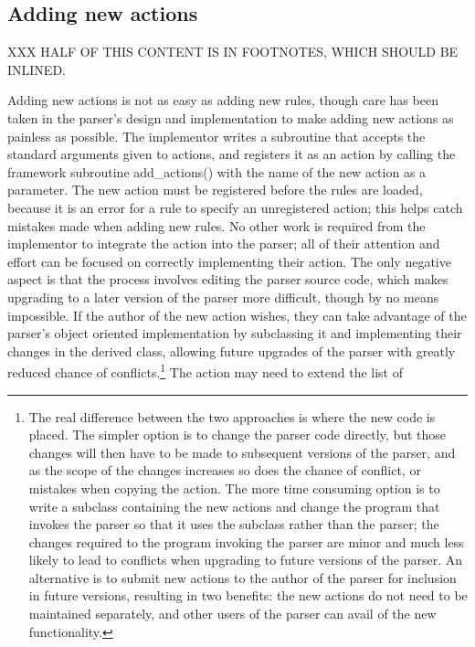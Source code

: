 \subsection{Adding new actions}

\label{adding new actions}

XXX HALF OF THIS CONTENT IS IN FOOTNOTES, WHICH SHOULD BE INLINED\@.

Adding new actions is not as easy as adding new rules, though care has been
taken in the parser's design and implementation to make adding new actions
as painless as possible.  The implementor writes a subroutine that accepts
the standard arguments given to actions, and registers it as an action by
calling the framework subroutine add\_actions() with the name of the new
action as a parameter.  The new action must be registered before the rules
are loaded, because it is an error for a rule to specify an unregistered
action; this helps catch mistakes made when adding new rules.  No other
work is required from the implementor to integrate the action into the
parser; all of their attention and effort can be focused on correctly
implementing their action.  The only negative aspect is that the process
involves editing the parser source code, which makes upgrading to a later
version of the parser more difficult, though by no means impossible.  If
the author of the new action wishes, they can take advantage of the
parser's object oriented implementation by subclassing it and implementing
their changes in the derived class, allowing future upgrades of the parser
with greatly reduced chance of conflicts.\footnote{The real difference
between the two approaches is where the new code is placed.  The simpler
option is to change the parser code directly, but those changes will then
have to be made to subsequent versions of the parser, and as the scope of
the changes increases so does the chance of conflict, or mistakes when
copying the action.  The more time consuming option is to write a subclass
containing the new actions and change the program that invokes the parser
so that it uses the subclass rather than the parser; the changes required
to the program invoking the parser are minor and much less likely to lead
to conflicts when upgrading to future versions of the parser.  An
alternative is to submit new actions to the author of the parser for
inclusion in future versions, resulting in two benefits: the new actions do
not need to be maintained separately, and other users of the parser can
avail of the new functionality.} The action may need to extend the list of
